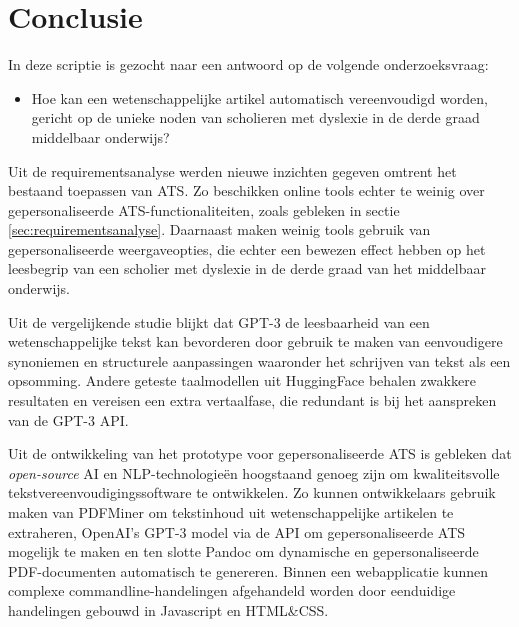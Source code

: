
\chapter{Conclusie}%
\label{ch:conclusie}

In deze scriptie is gezocht naar een antwoord op de volgende onderzoeksvraag:

\begin{itemize}
	\item Hoe kan een wetenschappelijke artikel automatisch vereenvoudigd worden, gericht op de unieke noden van scholieren met dyslexie in de derde graad middelbaar onderwijs?
\end{itemize}

\medspace

Uit de requirementsanalyse werden nieuwe inzichten gegeven omtrent het bestaand toepassen van ATS. Zo beschikken online tools echter te weinig over gepersonaliseerde ATS-functionaliteiten, zoals gebleken in sectie \ref{sec:requirementsanalyse}. Daarnaast maken weinig tools gebruik van gepersonaliseerde weergaveopties, die echter een bewezen effect hebben op het leesbegrip van een scholier met dyslexie in de derde graad van het middelbaar onderwijs.

\medspace

Uit de vergelijkende studie blijkt dat GPT-3 de leesbaarheid van een wetenschappelijke tekst kan bevorderen door gebruik te maken van eenvoudigere synoniemen en structurele aanpassingen waaronder het schrijven van tekst als een opsomming. Andere geteste taalmodellen uit HuggingFace behalen zwakkere resultaten en vereisen een extra vertaalfase, die redundant is bij het aanspreken van de GPT-3 API.

\medspace

Uit de ontwikkeling van het prototype voor gepersonaliseerde ATS is gebleken dat \textit{open-source} AI en NLP-technologieën hoogstaand genoeg zijn om kwaliteitsvolle tekstvereenvoudigingssoftware te ontwikkelen. Zo kunnen ontwikkelaars gebruik maken van PDFMiner om tekstinhoud uit wetenschappelijke artikelen te extraheren, OpenAI's GPT-3 model via de API om gepersonaliseerde ATS mogelijk te maken en ten slotte Pandoc om dynamische en gepersonaliseerde PDF-documenten automatisch te genereren. Binnen een webapplicatie kunnen complexe commandline-handelingen afgehandeld worden door eenduidige handelingen gebouwd in Javascript en HTML\&CSS.